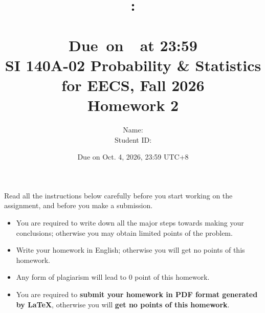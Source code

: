 \documentclass[a4paper]{article}
\title{
	\vspace{2in}
	\textmd{\textbf{\hmwkClass:\\  \hmwkTitle}}\\
	\normalsize\vspace{0.1in}\small{Due\ on\ \hmwkDueDate\ at 23:59}\\
	\vspace{4in}
}
\author{
	Name: \textbf{\hmwkAuthorName} \\
	Student ID: \hmwkAuthorID}
\date{}
\begin{document}
	
	
	
	\date{
		Due on Oct. 4, 2026, 23:59 UTC+8}
	\title{SI 140A-02  Probability \& Statistics for EECS, Fall 2026 \\
		Homework 2}
	\maketitle
	Read all the instructions below carefully before you start working on the assignment, and before you make a submission.
	\begin{itemize}
		\item You are required to write down all the major steps towards making your conclusions; otherwise you may obtain limited points of the problem.
		\item Write your homework in English; otherwise you will get no points of this homework.
		\item Any form of plagiarism will lead to $0$ point of this homework. 
        \item You are required to \textbf{submit your homework in PDF format generated by LaTeX}, otherwise you will
\textbf{get no points of this homework}.
	\end{itemize}

	\newpage
		
\end{document}
